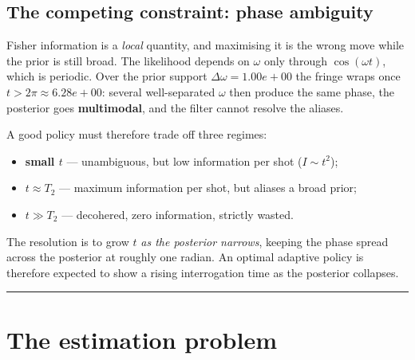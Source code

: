 \documentclass[12pt,a4paper]{article}
\begin{document}
\subsection{The competing constraint: phase ambiguity}
\label{sec:phase-ambiguity}
Fisher information is a \emph{local} quantity, and maximising it is the wrong
move while the prior is still broad. The likelihood depends on $\omega$ only
through $\cos(\omega t)$, which is periodic. Over the prior support
$\Delta\omega = 1.00e+00$ the fringe wraps once $t > 2\pi \approx 6.28e+00$:
several well-separated $\omega$ then produce the same phase, the posterior
goes \textbf{multimodal}, and the filter cannot resolve the aliases.

A good policy must therefore trade off three regimes:

\begin{itemize}
  \item \textbf{small $t$} --- unambiguous, but low information per shot
        ($I \sim t^{2}$);
  \item \textbf{$t \approx T_2$} --- maximum information per shot, but
        aliases a broad prior;
  \item \textbf{$t \gg T_2$} --- decohered, zero information, strictly wasted.
\end{itemize}

The resolution is to grow $t$ \emph{as the posterior narrows}, keeping the
phase spread across the posterior at roughly one radian. An optimal adaptive
policy is therefore expected to show a rising interrogation time as the
posterior collapses.

\noindent\rule{\textwidth}{0.4pt}
\FloatBarrier

\section{The estimation problem}
\label{sec:estimation}

\end{document}
